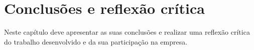 \chapter{Conclusões e reflexão crítica}
\label{chap:conclusions}

Neste capítulo deve apresentar as suas conclusões e realizar uma reflexão crítica do trabalho desenvolvido e da sua participação na empresa.